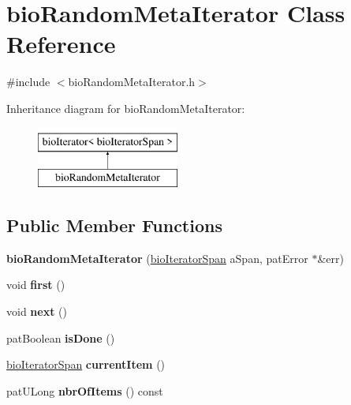 \hypertarget{classbio_random_meta_iterator}{}\section{bio\+Random\+Meta\+Iterator Class Reference}
\label{classbio_random_meta_iterator}


{\ttfamily \#include $<$bio\+Random\+Meta\+Iterator.\+h$>$}

Inheritance diagram for bio\+Random\+Meta\+Iterator\+:\begin{figure}[H]
\begin{center}
\leavevmode
\includegraphics[height=2.000000cm]{classbio_random_meta_iterator}
\end{center}
\end{figure}
\subsection*{Public Member Functions}
\begin{DoxyCompactItemize}
\item 
\mbox{\label{classbio_random_meta_iterator_ae44255fd64789a5fc3b5ce0b61c1f978}} 
{\bfseries bio\+Random\+Meta\+Iterator} (\hyperlink{classbio_iterator_span}{bio\+Iterator\+Span} a\+Span, pat\+Error $\ast$\&err)
\item 
\mbox{\label{classbio_random_meta_iterator_a89745256968e865e2b68732162abfefd}} 
void {\bfseries first} ()
\item 
\mbox{\label{classbio_random_meta_iterator_a7eff1bd2d9d3050e36424ccefeff29f8}} 
void {\bfseries next} ()
\item 
\mbox{\label{classbio_random_meta_iterator_a440699d5b0e610216f7cd46d11edb146}} 
pat\+Boolean {\bfseries is\+Done} ()
\item 
\mbox{\label{classbio_random_meta_iterator_a3c2be6c10035e0011132cb268e1bed0e}} 
\hyperlink{classbio_iterator_span}{bio\+Iterator\+Span} {\bfseries current\+Item} ()
\item 
\mbox{\label{classbio_random_meta_iterator_adfa8966a2b1925b19767da96ff036f43}} 
pat\+U\+Long {\bfseries nbr\+Of\+Items} () const
\end{DoxyCompactItemize}


